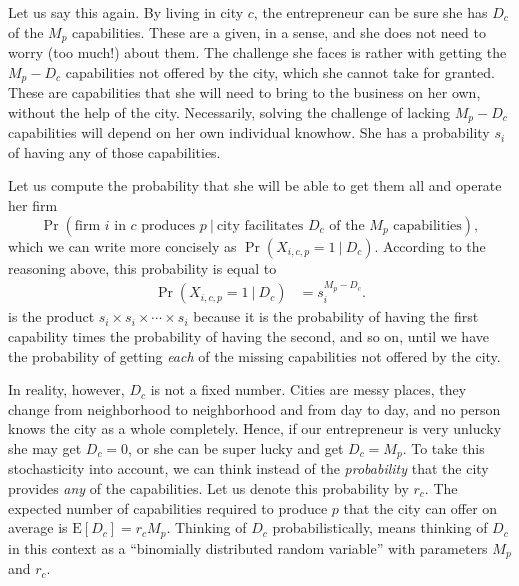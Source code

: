 \documentclass[12pt]{article}
\newcommand{\E}[1]{{\mathrm E}\left[ #1 \right]}
\begin{document}
Let us say this again. By living in city $c$, the entrepreneur can be sure she has $D_c$ of the $M_p$ capabilities. These are a given, in a sense, and she does not need to worry (too much!) about them. The challenge she faces is rather with getting the $M_p - D_c$ capabilities not offered by the city, which she cannot take for granted. These are capabilities that she will need to bring to the business on her own, without the help of the city. Necessarily, solving the challenge of lacking $M_p - D_c$ capabilities will depend on her own individual knowhow. She has a probability $s_i$ of having any of those capabilities. 

Let us compute the probability that she will be able to get them all and operate her firm 
$$\Pr(\text{firm $i$ in $c$ produces $p$}~|~\text{city facilitates $D_c$ of the $M_p$ capabilities}),$$
which we can write more concisely as $\Pr(X_{i,c,p}=1~|~D_c)$. According to the reasoning above, this probability is equal to
\begin{align}
	\Pr(X_{i,c,p}=1~|~D_c)&= s_i^{M_p-D_c}.
	\label{eq_probgivenDc}
\end{align}
 is the product $s_i\times s_i \times \cdots \times s_i $ because it is the probability of having the first capability times the probability of having the second, and so on, until we have the probability of getting \emph{each} of the missing capabilities not offered by the city.

In reality, however, $D_c$ is not a fixed number. Cities are messy places, they change from neighborhood to neighborhood and from day to day, and no person knows the city as a whole completely. Hence, if our entrepreneur is very unlucky she may get $D_c=0$, or she can be super lucky and get $D_c=M_p$. To take this stochasticity into account, we can think instead of the \emph{probability} that the city provides \emph{any} of the capabilities. Let us denote this probability by $r_c$. The expected number of capabilities required to produce $p$ that the city can offer on average is $\E{D_c} = r_c M_p$. Thinking of $D_c$ probabilistically, means thinking of $D_c$ in this context as a ``binomially distributed random variable'' with parameters $M_p$ and $r_c$. 
\end{document}
